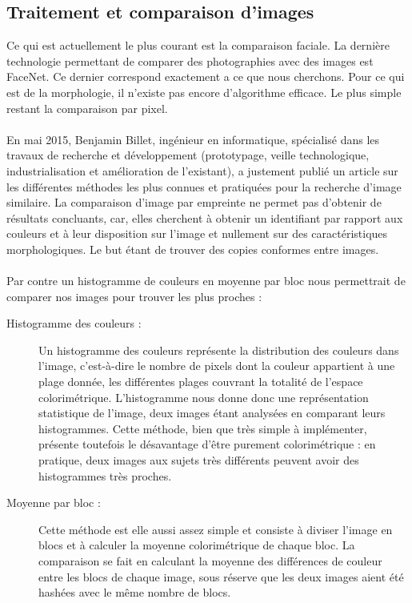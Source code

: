 \documentclass[a4paper,12pt]{article}
\begin{document}
\subsection{Traitement et comparaison d'images}
Ce qui est actuellement le plus courant est la comparaison faciale. La dernière technologie permettant de comparer des photographies avec des images est FaceNet. Ce dernier correspond exactement a ce que nous cherchons. 
Pour ce qui est de la morphologie, il n'existe pas encore d'algorithme efficace. Le plus simple restant la comparaison par pixel. \\ \\
En mai 2015, Benjamin Billet, ingénieur en informatique, spécialisé dans les travaux de recherche et développement (prototypage, veille technologique, industrialisation et amélioration de l'existant), a justement publié un article sur les différentes méthodes les plus connues et pratiquées pour la recherche d'image similaire. La comparaison d'image par empreinte ne permet pas d'obtenir de résultats concluants, car, elles cherchent à obtenir un identifiant par rapport aux couleurs et à leur disposition sur l'image et nullement sur des caractéristiques morphologiques. Le but étant de trouver des copies conformes entre images. \\ \\
Par contre un histogramme de couleurs en moyenne par bloc nous permettrait de comparer nos images pour trouver les plus proches : 
\begin{description}
\item [Histogramme des couleurs : ]
Un histogramme des couleurs représente la distribution des couleurs dans l'image, c'est-à-dire le nombre de pixels dont la couleur appartient à une plage donnée, les différentes plages couvrant la totalité de l'espace colorimétrique. L'histogramme nous donne donc une représentation statistique de l'image, deux images étant analysées en comparant leurs histogrammes. Cette méthode, bien que très simple à implémenter, présente toutefois le désavantage d'être purement colorimétrique : en pratique, deux images aux sujets très différents peuvent avoir des histogrammes très proches.
\item [Moyenne par bloc : ]
Cette méthode est elle aussi assez simple et consiste à diviser l'image en blocs et à calculer la moyenne colorimétrique de chaque bloc. La comparaison se fait en calculant la moyenne des différences de couleur entre les blocs de chaque image, sous réserve que les deux images aient été hashées avec le même nombre de blocs. \\
\end{description}
\end{document}
